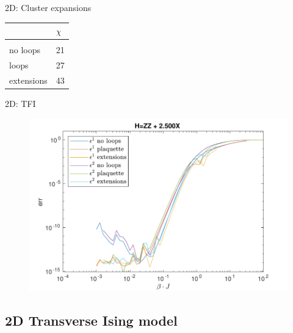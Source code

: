 \begin{frame}{2D: Cluster expansions}
\begin{minipage}{.6\textwidth}
    \end{minipage}
    \begin{minipage}{.39\textwidth}
        \begin{table}[]
            \begin{tabular}{l|l }
                           & $\chi$ \\
                \hline              \\
                no loops   & 21     \\
                loops      & 27     \\
                extensions & 43     \\
            \end{tabular}
        \end{table}

    \end{minipage}

\end{frame}

\begin{frame}{2D: TFI}

    \begin{figure}
        \center
        \includegraphics[height=\textheight]{../Figuren/benchmarking/2D_Err01_t_sing.pdf}
    \end{figure}

\end{frame}

\subsection{2D Transverse Ising model}


